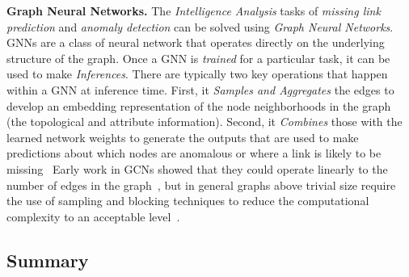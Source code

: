 \textbf{Graph Neural Networks.}
The \textit{Intelligence Analysis} tasks of \textit{missing link prediction} and \textit{anomaly detection} can be solved using \textit{Graph Neural Networks}. 
GNNs are a class of neural network that operates directly on the underlying structure of the graph. 
Once a GNN is \textit{trained} for a particular task, it can be used to make \textit{Inferences}.
There are typically two key operations that happen within a GNN at inference time. 
First, it \textit{Samples and Aggregates} the edges to develop an embedding representation of the node neighborhoods in the graph (the topological and attribute information). 
Second, it \textit{Combines} those with the learned network weights to generate the outputs that are used to make predictions about which nodes are anomalous or where a link is likely to be missing~\cite{Hamilton2017}
Early work in GCNs showed that they could operate linearly to the number of edges in the graph~\cite{Kipf2016}, but in general graphs above trivial size require the use of sampling and blocking techniques to reduce the computational complexity to an acceptable level~\cite{Hamilton2017}.




\subsection{Summary}
\label{section:127-graph-data-structures-summary}




